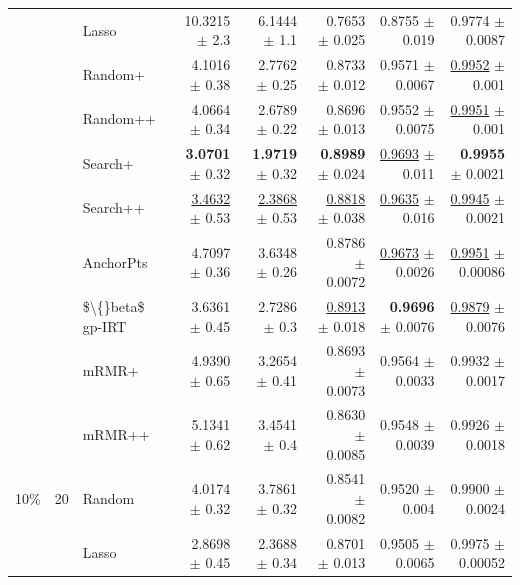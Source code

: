\begin{longtable}{llp{}rrrrr}
 &  & Lasso & 10.3215 {\scriptsize $\pm$ 2.3} & 6.1444 {\scriptsize $\pm$ 1.1} & 0.7653 {\scriptsize $\pm$ 0.025} & 0.8755 {\scriptsize $\pm$ 0.019} & 0.9774 {\scriptsize $\pm$ 0.0087} \\
 &  & Random+ & 4.1016 {\scriptsize $\pm$ 0.38} & 2.7762 {\scriptsize $\pm$ 0.25} & 0.8733 {\scriptsize $\pm$ 0.012} & 0.9571 {\scriptsize $\pm$ 0.0067} & \underline{0.9952} {\scriptsize $\pm$ 0.001} \\
 &  & Random++ & 4.0664 {\scriptsize $\pm$ 0.34} & 2.6789 {\scriptsize $\pm$ 0.22} & 0.8696 {\scriptsize $\pm$ 0.013} & 0.9552 {\scriptsize $\pm$ 0.0075} & \underline{0.9951} {\scriptsize $\pm$ 0.001} \\
 &  & Search+ & \textbf{3.0701} {\scriptsize $\pm$ 0.32} & \textbf{1.9719} {\scriptsize $\pm$ 0.32} & \textbf{0.8989} {\scriptsize $\pm$ 0.024} & \underline{0.9693} {\scriptsize $\pm$ 0.011} & \textbf{0.9955} {\scriptsize $\pm$ 0.0021} \\
 &  & Search++ & \underline{3.4632} {\scriptsize $\pm$ 0.53} & \underline{2.3868} {\scriptsize $\pm$ 0.53} & \underline{0.8818} {\scriptsize $\pm$ 0.038} & \underline{0.9635} {\scriptsize $\pm$ 0.016} & \underline{0.9945} {\scriptsize $\pm$ 0.0021} \\
 &  & AnchorPts & 4.7097 {\scriptsize $\pm$ 0.36} & 3.6348 {\scriptsize $\pm$ 0.26} & 0.8786 {\scriptsize $\pm$ 0.0072} & \underline{0.9673} {\scriptsize $\pm$ 0.0026} & \underline{0.9951} {\scriptsize $\pm$ 0.00086} \\
 &  & \$\textbackslash\{\}beta\$ gp-IRT & 3.6361 {\scriptsize $\pm$ 0.45} & 2.7286 {\scriptsize $\pm$ 0.3} & \underline{0.8913} {\scriptsize $\pm$ 0.018} & \textbf{0.9696} {\scriptsize $\pm$ 0.0076} & \underline{0.9879} {\scriptsize $\pm$ 0.0076} \\
 &  & mRMR+ & 4.9390 {\scriptsize $\pm$ 0.65} & 3.2654 {\scriptsize $\pm$ 0.41} & 0.8693 {\scriptsize $\pm$ 0.0073} & 0.9564 {\scriptsize $\pm$ 0.0033} & 0.9932 {\scriptsize $\pm$ 0.0017} \\
 &  & mRMR++ & 5.1341 {\scriptsize $\pm$ 0.62} & 3.4541 {\scriptsize $\pm$ 0.4} & 0.8630 {\scriptsize $\pm$ 0.0085} & 0.9548 {\scriptsize $\pm$ 0.0039} & 0.9926 {\scriptsize $\pm$ 0.0018} \\
\midrule
10\% & 20 & Random & 4.0174 {\scriptsize $\pm$ 0.32} & 3.7861 {\scriptsize $\pm$ 0.32} & 0.8541 {\scriptsize $\pm$ 0.0082} & 0.9520 {\scriptsize $\pm$ 0.004} & 0.9900 {\scriptsize $\pm$ 0.0024} \\
 &  & Lasso & 2.8698 {\scriptsize $\pm$ 0.45} & 2.3688 {\scriptsize $\pm$ 0.34} & 0.8701 {\scriptsize $\pm$ 0.013} & 0.9505 {\scriptsize $\pm$ 0.0065} & 0.9975 {\scriptsize $\pm$ 0.00052} \\

\end{longtable}
